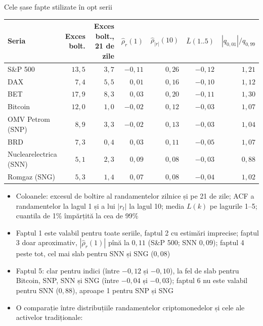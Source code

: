 \begin{frame}{Cele șase fapte stilizate în opt serii}
\itemsize{\footnotesize}
\begin{center}
\scriptsize
\begin{tabular}{lrrrrrr}
\toprule
Seria & Exces bolt. & Exces bolt., 21 de zile & $\hat\rho_r(1)$ & $\hat\rho_{|r|}(10)$ & $\bar L(1..5)$ & $|q_{0{,}01}|/q_{0{,}99}$ \\
\midrule
S\&P 500 & $13{,}5$ & $3{,}7$ & $-0{,}11$ & $0{,}26$ & $-0{,}12$ & $1{,}21$ \\
DAX & $7{,}4$ & $5{,}5$ & $0{,}01$ & $0{,}16$ & $-0{,}10$ & $1{,}12$ \\
BET & $17{,}9$ & $8{,}3$ & $0{,}03$ & $0{,}20$ & $-0{,}11$ & $1{,}30$ \\
Bitcoin & $12{,}0$ & $1{,}0$ & $-0{,}02$ & $0{,}12$ & $-0{,}03$ & $1{,}07$ \\
OMV Petrom (SNP) & $8{,}9$ & $3{,}3$ & $-0{,}02$ & $0{,}13$ & $-0{,}03$ & $1{,}04$ \\
BRD & $7{,}3$ & $0{,}4$ & $0{,}03$ & $0{,}11$ & $-0{,}05$ & $1{,}07$ \\
Nuclearelectrica (SNN) & $5{,}1$ & $2{,}3$ & $0{,}09$ & $0{,}08$ & $-0{,}03$ & $0{,}88$ \\
Romgaz (SNG) & $5{,}3$ & $1{,}4$ & $0{,}07$ & $0{,}08$ & $-0{,}04$ & $1{,}02$ \\
\bottomrule
\end{tabular}
\end{center}
\begin{itemize}
    \item Coloanele: excesul de boltire al randamentelor zilnice și pe 21 de zile; ACF a randamentelor la lagul 1 și a lui $|r_t|$ la lagul 10; media $L(k)$ pe lagurile 1--5; cuantila de 1\% împărțită la cea de 99\%
    \item Faptul 1 este valabil pentru toate seriile, faptul 2 cu estimări imprecise; faptul 3 doar aproximativ, $|\hat\rho_r(1)|$ pînă la $0{,}11$ (S\&P 500; SNN $0{,}09$); faptul 4 peste tot, cel mai slab pentru SNN și SNG ($0{,}08$)
    \item Faptul 5: clar pentru indici (între $-0{,}12$ și $-0{,}10$), la fel de slab pentru Bitcoin, SNP, SNN și SNG (între $-0{,}04$ și $-0{,}03$); faptul 6 nu este valabil pentru SNN ($0{,}88$), aproape 1 pentru SNP și SNG
    \item O comparație între distribuțiile randamentelor criptomonedelor și cele ale activelor tradiționale: 
\end{itemize}
\end{frame}

